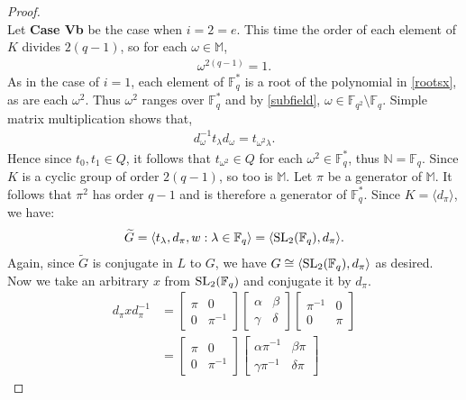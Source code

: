 \begin{proof}
\\
Let \textbf{Case Vb} be the case when $i = 2 = e$. This time the order of each element of $K$ divides $2(q-1)$, so for each $\omega \in \mathbb{M}$,
\begin{align}
    \label{rootsI} \omega^{2(q-1)} = 1.
\end{align}
As in the case of $i=1$, each element of $\mathbb{F}^*_q$ is a root of the polynomial in \eqref{rootsx}, as are each $\omega^2$. Thus $\omega^2$ ranges over $\mathbb{F}^*_q$ and by \eqref{subfield}, $\omega \in \mathbb{F}_{q^2} \setminus \mathbb{F}_q$. Simple matrix multiplication shows that, \\
\begin{align*} d_\omega^{-1} t_\lambda d_\omega = t_{\omega^2 \lambda}.
\end{align*}
Hence since $t_0, t_1 \in Q$, it follows that $t_{\omega^2} \in Q$ for each $\omega^2 \in \mathbb{F}^*_q$, thus $\mathbb{N} = \mathbb{F}_q$. Since $K$ is a cyclic group of order $2(q-1)$, so too is $\mathbb{M}$. Let $\pi$ be a generator of $\mathbb{M}$. It follows that $\pi^2$ has order $q-1$ and is therefore a generator of $\mathbb{F}^*_q$. Since $K = \langle d_\pi \rangle$, we have:
\begin{align*} {\widetilde{G}} = \langle t_\lambda, d_\pi, w : \lambda \in \mathbb{F}_q \rangle = \langle \operatorname{SL}_2(\mathbb{F}_q), d_\pi \rangle.
\end{align*}
Again, since ${\widetilde{G}}$ is conjugate in $L$ to $G$, we have $G \cong \langle \operatorname{SL}_2(\mathbb{F}_q), d_\pi \rangle$ as desired. Now we take an arbitrary $x$ from $\operatorname{SL}_2(\mathbb{F}_q)$ and conjugate it by $d_\pi$.
\begin{align*} d_\pi x d_\pi^{-1} &= \begin{bmatrix} \pi & 0 \\ 0 & \pi^{-1} \end{bmatrix} \begin{bmatrix} \alpha & \beta \\ \gamma & \delta \end{bmatrix}\begin{bmatrix} \pi^{-1} & 0 \\ 0 & \pi \end{bmatrix}
\\[1.5ex] &=  \begin{bmatrix} \pi & 0 \\ 0 & \pi^{-1} \end{bmatrix}  \begin{bmatrix} \alpha \pi^{-1} & \beta \pi \\ \gamma \pi^{-1} & \delta \pi \end{bmatrix}

\end{align*}
\end{proof}
